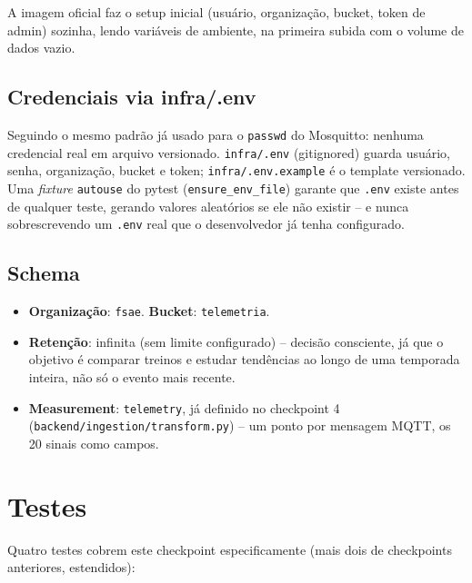 \documentclass[11pt,a4paper]{article}
\begin{document}
A imagem oficial faz o setup inicial (usuário, organização, bucket, token de admin) sozinha, lendo variáveis de ambiente, na primeira subida com o volume de dados vazio.

\subsection{Credenciais via infra/.env}

Seguindo o mesmo padrão já usado para o \texttt{passwd} do Mosquitto: nenhuma credencial real em arquivo versionado. \texttt{infra/.env} (gitignored) guarda usuário, senha, organização, bucket e token; \texttt{infra/.env.example} é o template versionado. Uma \textit{fixture} \texttt{autouse} do pytest (\texttt{ensure\_env\_file}) garante que \texttt{.env} existe antes de qualquer teste, gerando valores aleatórios se ele não existir -- e nunca sobrescrevendo um \texttt{.env} real que o desenvolvedor já tenha configurado.

\subsection{Schema}

\begin{itemize}
    \item \textbf{Organização}: \texttt{fsae}. \textbf{Bucket}: \texttt{telemetria}.
    \item \textbf{Retenção}: infinita (sem limite configurado) -- decisão consciente, já que o objetivo é comparar treinos e estudar tendências ao longo de uma temporada inteira, não só o evento mais recente.
    \item \textbf{Measurement}: \texttt{telemetry}, já definido no checkpoint 4 (\texttt{backend/ingestion/transform.py}) -- um ponto por mensagem MQTT, os 20 sinais como campos.
\end{itemize}

\section{Testes}

Quatro testes cobrem este checkpoint especificamente (mais dois de checkpoints anteriores, estendidos):
\end{document}
